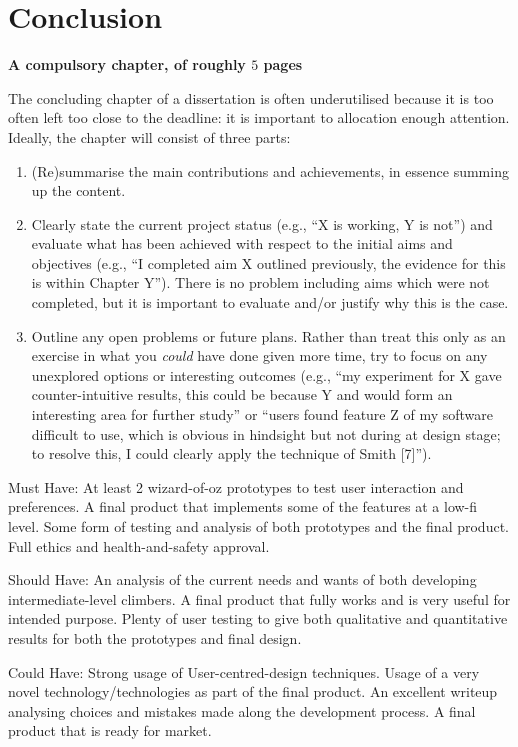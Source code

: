 \chapter{Conclusion}
\label{chap:conclusion}

{\bf A compulsory chapter,     of roughly $5$ pages} 
\vspace{1cm} 

\noindent
The concluding chapter of a dissertation is often underutilised because it 
is too often left too close to the deadline: it is important to allocation
enough attention.  Ideally, the chapter will consist of three parts:

\begin{enumerate}
\item (Re)summarise the main contributions and achievements, in essence
      summing up the content.
\item Clearly state the current project status (e.g., ``X is working, Y 
      is not'') and evaluate what has been achieved with respect to the 
      initial aims and objectives (e.g., ``I completed aim X outlined 
      previously, the evidence for this is within Chapter Y'').  There 
      is no problem including aims which were not completed, but it is 
      important to evaluate and/or justify why this is the case.
\item Outline any open problems or future plans.  Rather than treat this
      only as an exercise in what you {\em could} have done given more 
      time, try to focus on any unexplored options or interesting outcomes
      (e.g., ``my experiment for X gave counter-intuitive results, this 
      could be because Y and would form an interesting area for further 
      study'' or ``users found feature Z of my software difficult to use,
      which is obvious in hindsight but not during at design stage; to 
      resolve this, I could clearly apply the technique of Smith [7]'').
\end{enumerate}





Must Have: At least 2 wizard-of-oz prototypes to test user interaction and preferences.
A final product that implements some of the features at a low-fi level. Some form of testing and analysis of both prototypes and the final product.
Full ethics and health-and-safety approval.


Should Have:
An analysis of the current needs and wants of both developing intermediate-level climbers.
A final product that fully works and is very useful for intended purpose.
Plenty of user testing to give both qualitative and quantitative results for both the prototypes and final design.

Could Have: Strong usage of User-centred-design techniques.
Usage of a very novel technology/technologies as part of the final product.
An excellent writeup analysing choices and mistakes made along the development process.
A final product that is ready for market.
